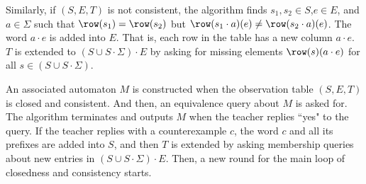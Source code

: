 Similarly, if $(S,E,T)$ is not consistent, the algorithm finds $s_1,s_2\in S$,$e\in E$, and $a\in \Sigma$ such that $\row(s_1)=\row(s_2)$ but $\row(s_1\cdot a)(e)\neq \row(s_2\cdot a)(e)$. The word $a\cdot e$ is added into $E$. That is, each row in the table has a new column $a\cdot e$. $T$ is extended to $(S\cup S\cdot \Sigma)\cdot E$ by asking for missing elements $\row(s)(a\cdot e)$ for all $s\in (S\cup S\cdot \Sigma)$.

An associated automaton $M$ is constructed when the observation table
$(S,E,T)$ is closed and consistent. And then, an equivalence query
about $M$ is asked for. The algorithm terminates and outputs $M$ when
the teacher replies ``yes" to the query. If the teacher replies with a
counterexample $c$, the word $c$ and all its prefixes are added into
$S$, and then $T$ is extended by asking membership queries about new
entries in $(S\cup S\cdot \Sigma)\cdot E$. Then, a new round for the main
loop of closedness and consistency starts.

